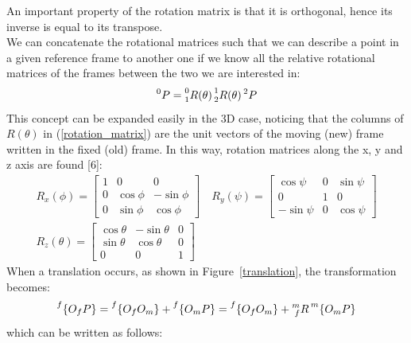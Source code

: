 \documentclass[a4paper,12pt,oneside]{report}
\begin{document}
An important property of the rotation matrix is that it is orthogonal, hence its inverse is equal to its transpose.\\
We can concatenate the rotational matrices such that we can describe a point in a given reference frame to another one if we know all the relative rotational matrices of the frames between the two we are interested in:
\begin{equation}
  \prescript{0}{}{P}=\prescript{0}{1}{R(\theta)}\prescript{1}{2}{R(\theta)}\prescript{2}{}{P}
  \label{concatenate}
\end{equation}
This concept can be expanded easily in the 3D case, noticing that the columns of $R(\theta)$ in (\ref{rotation_matrix}) are the unit vectors of the moving (new) frame written in the fixed (old) frame. In this way, rotation matrices along the x, y and z axis are found [6]:
\begin{equation}
  \begin{array}{c}
  R_x(\phi)=\begin{bmatrix}
    1&0&0\\
    0&\cos{\phi}&-\sin{\phi}\\
    0&\sin{\phi}&\cos{\phi}
  \end{bmatrix} \quad R_y(\psi)=\begin{bmatrix}
    \cos{\psi}&0&\sin{\psi}\\
    0&1&0\\
    -\sin{\psi}&0&\cos{\psi}
  \end{bmatrix} \\
  R_z(\theta)=\begin{bmatrix}
    \cos{\theta}&-\sin{\theta}&0\\
    \sin{\theta}&\cos{\theta}&0\\
    0&0&1
  \end{bmatrix} 
\end{array}
\label{rotation_matrices}
\end{equation}
When a translation occurs, as shown in Figure~\ref{translation}, the transformation becomes:
\begin{equation}
  \prescript{f}{}{\{O_fP\}}=\prescript{f}{}{\{O_fO_m\}}+\prescript{f}{}{\{O_mP\}}=\prescript{f}{}{\{O_fO_m\}}+\prescript{m}{f}{R}\prescript{m}{}{\{O_mP\}}
\end{equation}
which can be written as follows:
\end{document}
